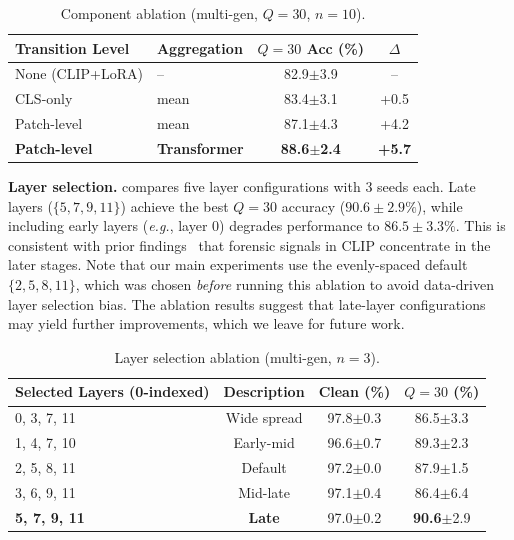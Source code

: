 \documentclass[runningheads]{llncs}
\newcommand{\eg}{\textit{e.g.}}
\begin{document}
\begin{table}[t]
\centering
\caption{Component ablation (multi-gen, $Q{=}30$, $n{=}10$).}
\label{tab:component_ablation}
\setlength{\tabcolsep}{5pt}
\begin{tabular}{llcc}
\toprule
Transition Level & Aggregation & $Q{=}30$ Acc (\%) & $\Delta$ \\
\midrule
None (CLIP+LoRA)   & --            & 82.9\scriptsize$\pm$3.9 & --     \\
CLS-only           & mean          & 83.4\scriptsize$\pm$3.1 & +0.5   \\
Patch-level        & mean          & 87.1\scriptsize$\pm$4.3 & +4.2   \\
\textbf{Patch-level} & \textbf{Transformer} & \textbf{88.6}\scriptsize$\pm$\textbf{2.4} & \textbf{+5.7} \\
\bottomrule
\end{tabular}
\end{table}

\noindent\textbf{Layer selection.}
 compares five layer configurations with 3 seeds each.
Late layers ($\{5,7,9,11\}$) achieve the best $Q{=}30$ accuracy ($90.6{\pm}2.9\%$), while including early layers (\eg, layer 0) degrades performance to $86.5{\pm}3.3\%$.
This is consistent with prior findings~\cite{koutlis2024rine,mold2025} that forensic signals in CLIP concentrate in the later stages.
Note that our main experiments use the evenly-spaced default $\{2,5,8,11\}$, which was chosen \emph{before} running this ablation to avoid data-driven layer selection bias.
The ablation results suggest that late-layer configurations may yield further improvements, which we leave for future work.

\begin{table}[t]
\centering
\caption{Layer selection ablation (multi-gen, $n{=}3$).}
\label{tab:layer_selection}
\setlength{\tabcolsep}{5pt}
\begin{tabular}{lccc}
\toprule
Selected Layers (0-indexed) & Description & Clean (\%) & $Q{=}30$ (\%) \\
\midrule
0, 3, 7, 11                & Wide spread & 97.8\scriptsize$\pm$0.3 & 86.5\scriptsize$\pm$3.3 \\
1, 4, 7, 10                & Early-mid   & 96.6\scriptsize$\pm$0.7 & 89.3\scriptsize$\pm$2.3 \\
2, 5, 8, 11                & Default     & 97.2\scriptsize$\pm$0.0 & 87.9\scriptsize$\pm$1.5 \\
3, 6, 9, 11                & Mid-late    & 97.1\scriptsize$\pm$0.4 & 86.4\scriptsize$\pm$6.4 \\
\textbf{5, 7, 9, 11}       & \textbf{Late} & 97.0\scriptsize$\pm$0.2 & \textbf{90.6}\scriptsize$\pm$2.9 \\
\bottomrule
\end{tabular}
\end{table}
\end{document}
